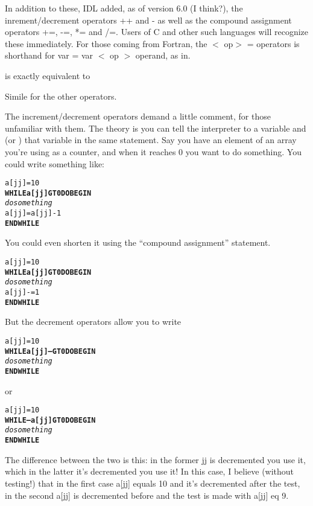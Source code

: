   In addition to these, IDL added, as of version 6.0 (I think?), the
  inrement/decrement operators ++ and \-- as well as the compound
  assignment operators +=, -=, *= and /=. Users of C and other such
  languages will recognize these immediately. For those coming from
  Fortran, the $<$ op$>$ = operators is shorthand for var = var $<$ op
  $>$ operand, as in.


  is exactly equivalent to


  Simile for the other operators.

  The increment/decrement operators demand a little comment, for those
  unfamiliar with them. The theory is you can tell the interpreter to
   a variable and  (or ) that
  variable in the same statement. Say you have an element of an array
  you're using as a counter, and when it reaches 0 you want to do
  something. You could write something like:

  \begin{alltt}
  a[jj]=10
  \textbf{WHILE a[jj] GT 0 DO BEGIN}
    \textit{do something}
    a[jj] = a[jj]-1
  \textbf{ENDWHILE}
  \end{alltt}

  You could even shorten it using the ``compound assignment'' statement.

  \begin{alltt}
  a[jj]=10
  \textbf{WHILE a[jj] GT 0 DO BEGIN}
    \textit{do something}
    a[jj]-=1
  \textbf{ENDWHILE}
  \end{alltt}

  But the decrement operators allow you to write 

  \begin{alltt}
  a[jj]=10
  \textbf{WHILE a[jj]-- GT 0 DO BEGIN}
    \textit{do something}
  \textbf{ENDWHILE}
  \end{alltt}

  or 

  \begin{alltt}
  a[jj]=10
  \textbf{WHILE --a[jj] GT 0 DO BEGIN}
    \textit{do something}
  \textbf{ENDWHILE}
  \end{alltt}

  The difference between the two is this: in the former jj is
  decremented  you use it, which in the latter it's
  decremented  you use it! In this case, I believe
  (without testing!) that in the first case a[jj] equals 10 and it's
  decremented after the test, in the second a[jj] is decremented
  before and the test is made with a[jj] eq 9.

